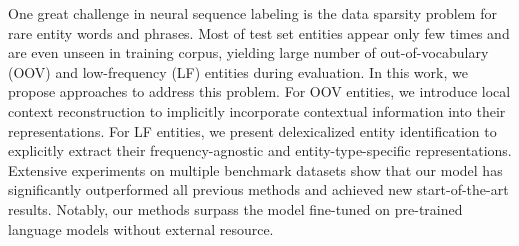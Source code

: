One great challenge in neural sequence labeling is the data sparsity problem for rare entity words and phrases. Most of test set entities appear only few times and are even unseen in training corpus, yielding large number of out-of-vocabulary (OOV) and low-frequency (LF) entities during evaluation. In this work, we propose approaches to address this problem. For OOV entities, we introduce local context reconstruction to implicitly incorporate contextual information into their representations. For LF entities, we present delexicalized entity identification to explicitly extract their frequency-agnostic and entity-type-specific representations. Extensive experiments on multiple benchmark datasets show that our model has significantly outperformed all previous methods and achieved new start-of-the-art results. Notably, our methods surpass the model fine-tuned on pre-trained language models without external resource.
